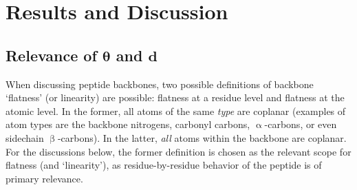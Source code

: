 \documentclass[fleqn,10pt,lineno]{wlpeerj} %
\newcommand{\n}[1]{{\color{black}#1}} %
\begin{document}
\section*{Results and Discussion}

\subsection*{Relevance of $\bm \theta$ and $\bm d$}

When discussing peptide backbones, two possible definitions of backbone `flatness' (or linearity) are possible: flatness at a residue level and flatness at the atomic level. In the former, all atoms of the same {\em type} are coplanar (examples of atom types are \n{the} backbone nitrogen\n{s}, carbonyl carbon\n{s}, $\upalpha$-carbon\n{s}, or even sidechain $\upbeta$-carbon\n{s}). In the latter, {\em all} atoms within the backbone are coplanar. \n{For the discussions below, the former definition is chosen as the relevant scope for flatness (and `linearity'), as residue-by-residue behavior of the peptide is of primary relevance.} 
\end{document}
